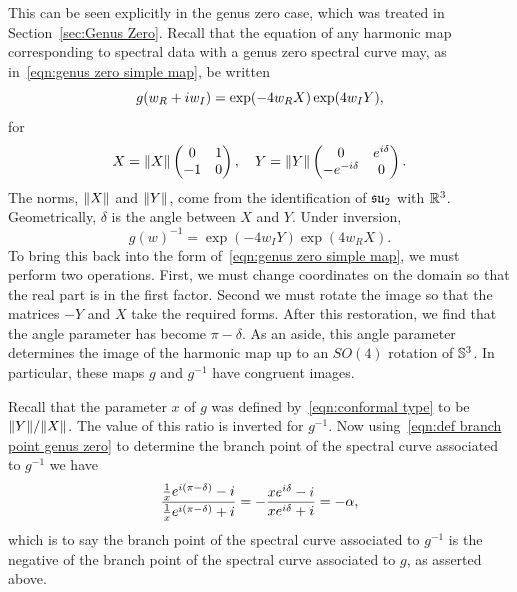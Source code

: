 \documentclass{article}
\begin{document}
This can be seen explicitly in the genus zero case, which was treated in Section~\ref{sec:Genus Zero}. Recall that the equation of any harmonic map corresponding to spectral data with a genus zero spectral curve may, as in~\eqref{eqn:genus zero simple map}, be written
\[
g(w_R + \iu w_I) = \exp (-4w_R X) \exp (4w_I Y),
\]
for
\[
X = \norm{X}\begin{pmatrix}
0 & 1 \\
-1 & 0
\end{pmatrix}, \quad
Y = \norm{Y}\begin{pmatrix}
0 & e^{\iu \delta} \\
-e^{-\iu \delta} & 0
\end{pmatrix}.
\]
The norms, $\norm{X}$ and $\norm{Y}$, come from the identification of $\su_2$ with $\R^3$. Geometrically, $\delta$ is the angle between $X$ and $Y$. Under inversion,
\[
g(w)^{-1} = \exp (-4w_I Y) \exp (4w_R X).
\]
To bring this back into the form of~\eqref{eqn:genus zero simple map}, we must perform two operations. First, we must change coordinates on the domain so that the real part is in the first factor. 
Second we must rotate the image so that the matrices $-Y$ and $X$ take the required forms. After this restoration, we find that the angle parameter has become $\pi-\delta$. As an aside, 
this angle parameter determines the image of the harmonic map up to an $SO(4)$ rotation of $\S^3$. In particular, these maps $g$ and $g^{-1}$ have congruent images.

Recall that the parameter $x$ of $g$ was defined by~\eqref{eqn:conformal type} to be $\norm{Y}/\norm{X}$. The value of this ratio is inverted for $g^{-1}$. Now using~\eqref{eqn:def branch point genus zero} to determine the branch point of the spectral curve associated to $g^{-1}$ we have
\[
\frac{\frac{1}{x} e^{\iu (\pi-\delta)} - \iu}{\frac{1}{x} e^{\iu (\pi-\delta)} + \iu}
= -\frac{x e^{\iu \delta}-\iu}{x e^{\iu \delta} + \iu} 
= -\alpha,
\]
which is to say the branch point of the spectral curve associated to $g^{-1}$ is the negative of the branch point of the spectral curve associated to $g$, as asserted above.
\end{document}
